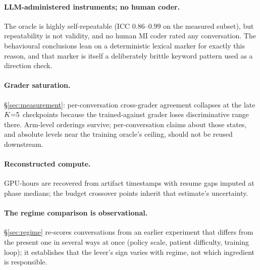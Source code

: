 \paragraph{LLM-administered instruments; no human coder.} The oracle is highly self-repeatable
(ICC $0.86$--$0.99$ on the measured subset), but repeatability is not validity, and no human MI
coder rated any conversation. The behavioural conclusions lean on a deterministic lexical marker
for exactly this reason, and that marker is itself a deliberately brittle keyword pattern used
as a direction check.

\paragraph{Grader saturation.} \S\ref{sec:measurement}: per-conversation cross-grader agreement
collapses at the late $K{=}5$ checkpoints because the trained-against grader loses discriminative
range there. Arm-level orderings survive; per-conversation claims about those states, and
absolute levels near the training oracle's ceiling, should not be reused downstream.

\paragraph{Reconstructed compute.} GPU-hours are recovered from artifact timestamps with resume
gaps imputed at phase medians; the budget crossover points inherit that estimate's uncertainty.

\paragraph{The regime comparison is observational.} \S\ref{sec:regime} re-scores conversations
from an earlier experiment that differs from the present one in several ways at once (policy
scale, patient difficulty, training loop); it establishes that the lever's sign varies with
regime, not which ingredient is responsible.
